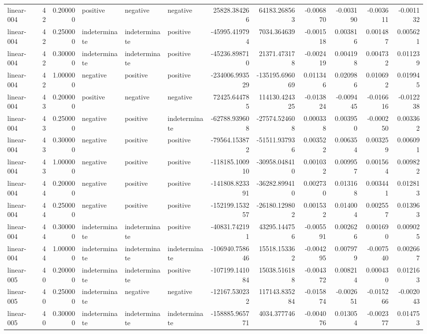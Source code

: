 \begin{tabular}{lrrlllrrrrrr}
linear-004 & 42 & 0.200000 & positive & negative & negative & 25828.384266 & 64183.268563 & -0.006870 & -0.003190 & -0.003611 & -0.001132 \\
linear-004 & 42 & 0.250000 & indeterminate & indeterminate & positive & -45995.419794 & 7034.364639 & -0.001518 & 0.003816 & 0.001487 & 0.005621 \\
linear-004 & 42 & 0.300000 & indeterminate & indeterminate & positive & -45236.898710 & 21371.473178 & -0.002419 & 0.004198 & 0.004732 & 0.011239 \\
linear-004 & 42 & 1.000000 & negative & positive & positive & -234006.993529 & -135195.696069 & 0.011346 & 0.020986 & 0.010692 & 0.019945 \\
linear-004 & 43 & 0.200000 & positive & negative & negative & 72425.644785 & 114130.424325 & -0.013824 & -0.009445 & -0.016616 & -0.012238 \\
linear-004 & 43 & 0.250000 & negative & positive & indeterminate & -62788.939608 & -27574.524608 & 0.000338 & 0.003950 & -0.000250 & 0.003362 \\
linear-004 & 43 & 0.300000 & negative & positive & positive & -79564.153872 & -51511.937936 & 0.003522 & 0.006354 & 0.003259 & 0.006091 \\
linear-004 & 43 & 1.000000 & negative & positive & positive & -118185.100910 & -30958.048410 & 0.001032 & 0.009957 & 0.001564 & 0.009822 \\
linear-004 & 44 & 0.200000 & negative & positive & positive & -141808.823391 & -36282.899410 & 0.002730 & 0.013168 & 0.003441 & 0.012813 \\
linear-004 & 44 & 0.250000 & negative & positive & positive & -152199.153257 & -26180.129802 & 0.001532 & 0.014004 & 0.002557 & 0.013963 \\
linear-004 & 44 & 0.300000 & indeterminate & indeterminate & positive & -40831.742191 & 43295.144756 & -0.005591 & 0.002626 & 0.001690 & 0.009025 \\
linear-004 & 44 & 1.000000 & indeterminate & indeterminate & indeterminate & -106940.758646 & 15518.153362 & -0.004295 & 0.007979 & -0.007540 & 0.002667 \\
linear-005 & 40 & 0.200000 & indeterminate & indeterminate & positive & -107199.141084 & 15038.516188 & -0.004372 & 0.008214 & 0.000430 & 0.012163 \\
linear-005 & 40 & 0.250000 & indeterminate & negative & negative & -12167.530232 & 117143.835284 & -0.015874 & -0.002651 & -0.015266 & -0.002043 \\
linear-005 & 40 & 0.300000 & indeterminate & indeterminate & indeterminate & -158885.965771 & 4034.377746 & -0.004076 & 0.013054 & -0.002377 & 0.014753 \\

\end{tabular}
